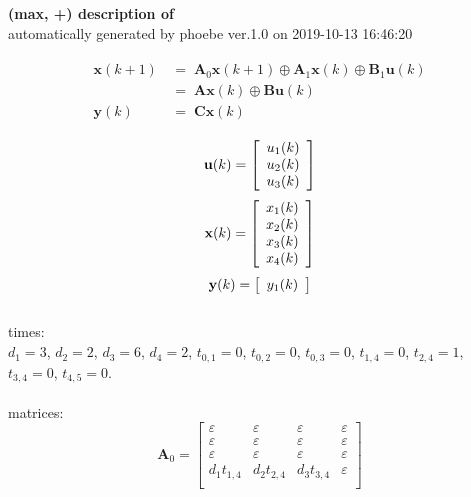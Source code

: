 \documentclass[11pt, a4paper, fleqn]{article}
\begin{document}
\noindent
\textbf{(max, +) description of} \texttt{\currfilebase} \\
automatically generated by phoebe ver.1.0 on 2019-10-13 16:46:20 

\begin{align}\begin{split}
\mathbf{x}(k+1) & \, = \; \mathbf{A}_{0}\mathbf{x}(k+1) \oplus \mathbf{A}_{1}\mathbf{x}(k) \oplus \mathbf{B}_{1}\mathbf{u}(k)\\
& \, = \; \mathbf{Ax}(k) \oplus \mathbf{Bu}(k)\\
\mathbf{y}(k) & \, = \; \mathbf{Cx}(k)
\end{split}\end{align}

\begin{equation*}
\mathbf{u}(k) = 
\left[\begin{array}{*{20}c}
  u_1(k) \\
  u_2(k) \\
  u_3(k) \\
\end{array}\right]
\end{equation*}
\begin{equation*}
\mathbf{x}(k) = 
\left[\begin{array}{*{20}c}
  x_1(k) \\
  x_2(k) \\
  x_3(k) \\
  x_4(k) \\
\end{array}\right]
\end{equation*}
\begin{equation*}
\mathbf{y}(k) = 
\left[\begin{array}{*{20}c}
  y_1(k) \\
\end{array}\right]
\end{equation*}
\noindent\\
times:\\
$d_1 = 3$, $d_2 = 2$, $d_3 = 6$, $d_4 = 2$, $t_{0,1} = 0$, $t_{0,2} = 0$, $t_{0,3} = 0$, $t_{1,4} = 0$, $t_{2,4} = 1$, $t_{3,4} = 0$, $t_{4,5} = 0$.\\
\\
matrices:
\begin{equation*}
\mathbf{A}_{0} = 
\left[\begin{array}{ cccc }
\varepsilon	&\varepsilon	&\varepsilon	&\varepsilon\\
\varepsilon	&\varepsilon	&\varepsilon	&\varepsilon\\
\varepsilon	&\varepsilon	&\varepsilon	&\varepsilon\\
d_1t_{1,4}	&d_2t_{2,4}	&d_3t_{3,4}	&\varepsilon\\
\end{array}\right]
\end{equation*}
\end{document}
